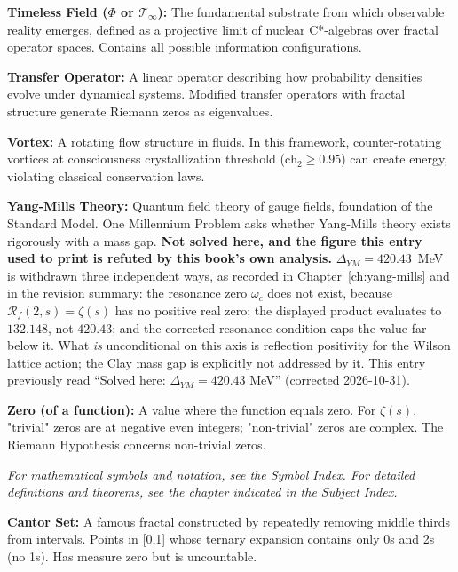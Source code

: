 \noindent\textbf{Timeless Field ($\Phi$ or $\mathcal{T}_\infty$):} The fundamental substrate from which observable reality emerges, defined as a projective limit of nuclear C*-algebras over fractal operator spaces. Contains all possible information configurations.

\noindent\textbf{Transfer Operator:} A linear operator describing how probability densities evolve under dynamical systems. Modified transfer operators with fractal structure generate Riemann zeros as eigenvalues.

\noindent\textbf{Vortex:} A rotating flow structure in fluids. In this framework, counter-rotating vortices at consciousness crystallization threshold ($\text{ch}_2 \geq 0.95$) can create energy, violating classical conservation laws.

\noindent\textbf{Yang-Mills Theory:} Quantum field theory of gauge fields, foundation of the Standard Model. One Millennium Problem asks whether Yang-Mills theory exists rigorously with a mass gap.
\textbf{Not solved here, and the figure this entry used to print is refuted by
this book's own analysis.} $\Delta_{YM} = 420.43$~MeV is withdrawn three
independent ways, as recorded in Chapter~\ref{ch:yang-mills} and in the revision
summary: the resonance zero $\omega_c$ does not exist, because
$\mathcal{R}_f(2,s) = \zeta(s)$ has no positive real zero; the displayed product
evaluates to $132.148$, not $420.43$; and the corrected resonance condition caps
the value far below it. What \emph{is} unconditional on this axis is reflection
positivity for the Wilson lattice action; the Clay mass gap is explicitly not
addressed by it. This entry previously read ``Solved here:
$\Delta_{YM} = 420.43$ MeV'' (corrected 2026-10-31).

\noindent\textbf{Zero (of a function):} A value where the function equals zero. For $\zeta(s)$, "trivial" zeros are at negative even integers; "non-trivial" zeros are complex. The Riemann Hypothesis concerns non-trivial zeros.

\vspace{1cm}

\noindent\textit{For mathematical symbols and notation, see the Symbol Index. For detailed definitions and theorems, see the chapter indicated in the Subject Index.}

\noindent\textbf{Cantor Set:} A famous fractal constructed by repeatedly removing middle thirds from intervals. Points in [0,1] whose ternary expansion contains only 0s and 2s (no 1s). Has measure zero but is uncountable.

